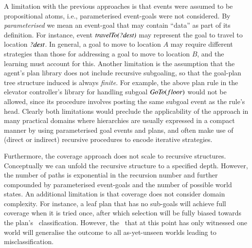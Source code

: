 
A limitation with the previous approaches is that events were assumed to be
propositional atoms, i.e., parameterised event-goals were not considered. By
\emph{parameterised} we mean an event-goal that may contain ``data'' as part of
its definition. For instance, event ${\mbox{\textit{travelTo(?dest)}}}$ may represent
the goal to travel to location ${\mbox{\textit{?dest}}}$. In general, a goal to move to
location $A$ may require different strategies than those for addressing a goal to
move to location $B$, and the learning must account for this.
Another limitation is the assumption that the agent's plan library does not
include recursive subgoaling, so that the goal-plan tree structure induced is
always \emph{finite}.
For example, the above plan rule in the elevator controller's library for
handling subgoal $\mbox{\textit{GoTo}}(floor)$ would not be allowed, since its procedure
involves posting the same subgoal event as the rule's head.
Clearly both limitations would preclude the applicability of the approach in many
practical domains where hierarchies are usually expressed in a compact manner by
using parameterised goal events and plans, and often make use of (direct or
indirect) recursive procedures to encode iterative strategies.



Furthermore, the coverage approach \cite{Singh:AAMAS10} does not scale
to recursive structures. 
Conceptually we can unfold the recursive structure to a
specified depth. However, the number of paths is exponential in the
recursion number and further compounded by parameterised event-goals
and the number of possible world states.
%
An additional limitation is that coverage does not consider domain
complexity. For instance, a leaf plan that has no sub-goals will
achieve full coverage when it is tried once, after which selection
will be fully biased towards the plan's \dt\ classification. However,
the \dt\ that at this point has only witnessed one world will
generalise the outcome to all as-yet-unseen worlds leading to
misclassification. 

